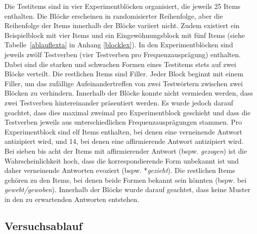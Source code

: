  

Die Testitems sind in vier Experimentblöcken organisiert, die jeweils 25 Items enthalten. Die Blöcke erscheinen in randomisierter Reihenfolge, aber die Reihenfolge der Items innerhalb der Blöcke variiert nicht. Zudem existiert ein Beispielblock mit vier Items und ein Eingewöhnungsblock mit fünf Items (siehe Tabelle~\ref{ablauflexta} in Anhang \ref{blocklex}). In den Experimentblöcken sind jeweils zwölf Testverben (vier Testverben pro Frequenzausprägung) enthalten. Dabei sind die starken und schwachen Formen eines Testitems stets auf zwei Blöcke verteilt. Die restlichen Items sind Filler. Jeder Block beginnt mit einem Filler, um das zufällige Aufeinandertreffen von zwei Testwörtern zwischen zwei Blöcken zu verhindern. Innerhalb der Blöcke konnte nicht vermieden werden, dass zwei Testverben hintereinander präsentiert werden. Es wurde jedoch darauf geachtet, dass dies maximal zweimal pro Experimentblock geschieht und dass die Testverben jeweils aus unterschiedlichen Frequenzausprägungen stammen. Pro Experimentblock sind elf Items enthalten, bei denen eine verneinende Antwort antizipiert wird, und 14, bei denen eine affirmierende Antwort antizipiert wird. Bei sieben bis acht der Items mit affirmierender Antwort (bspw. \textit{gezogen}) ist die Wahrscheinlichkeit hoch, dass die korrespondierende Form unbekannt ist und daher verneinende Antworten evoziert (bspw. *\textit{gezieht}). Die restlichen Items gehören zu den Items, bei denen beide Formen bekannt sein könnten (bspw. bei \textit{gewebt/gewoben}). Innerhalb der Blöcke wurde darauf geachtet, dass keine Muster in den zu erwartenden Antworten entstehen.

\subsection{Versuchsablauf}
\label{ablauffreq}

